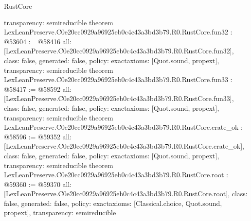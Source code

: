 \begin{lexlean}{RustCore}
\begin{coremodule}
{  transparency: semireducible
}
theorem LexLeanPreserve.C0e20cc0929a96925eb0c4c43a3bd3b79.R0.RustCore.fun32 : @53604 := @58416 {
  all: [LexLeanPreserve.C0e20cc0929a96925eb0c4c43a3bd3b79.R0.RustCore.fun32],
  class: false,
  generated: false,
  policy: exact{axioms: [Quot.sound, propext]},
  transparency: semireducible
}
theorem LexLeanPreserve.C0e20cc0929a96925eb0c4c43a3bd3b79.R0.RustCore.fun33 : @58417 := @58592 {
  all: [LexLeanPreserve.C0e20cc0929a96925eb0c4c43a3bd3b79.R0.RustCore.fun33],
  class: false,
  generated: false,
  policy: exact{axioms: [Quot.sound, propext]},
  transparency: semireducible
}
theorem LexLeanPreserve.C0e20cc0929a96925eb0c4c43a3bd3b79.R0.RustCore.crate_ok : @58596 := @59352 {
  all: [LexLeanPreserve.C0e20cc0929a96925eb0c4c43a3bd3b79.R0.RustCore.crate_ok],
  class: false,
  generated: false,
  policy: exact{axioms: [Quot.sound, propext]},
  transparency: semireducible
}
theorem LexLeanPreserve.C0e20cc0929a96925eb0c4c43a3bd3b79.R0.RustCore.root : @59360 := @59370 {
  all: [LexLeanPreserve.C0e20cc0929a96925eb0c4c43a3bd3b79.R0.RustCore.root],
  class: false,
  generated: false,
  policy: exact{axioms: [Classical.choice, Quot.sound, propext]},
  transparency: semireducible
}


\end{coremodule}
\end{lexlean}
